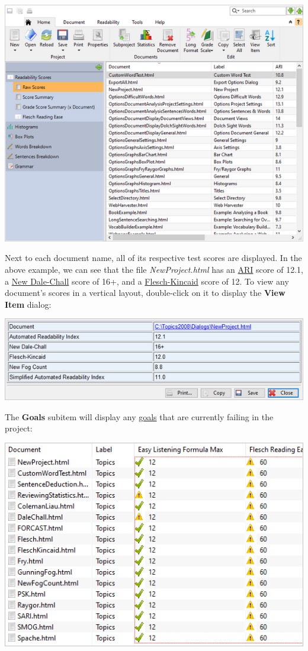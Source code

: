 \documentclass[
]{book}
\theoremstyle{definition}
\theoremstyle{definition}
\theoremstyle{definition}
\theoremstyle{definition}
\theoremstyle{remark}
\begin{document}
\includegraphics{Images/batchrawscores.png}

Next to each document name, all of its respective test scores are displayed. In the above example, we can see that the file \emph{NewProject.html} has an \protect\hyperlink{ari-test}{ARI} score of 12.1, a \protect\hyperlink{dale-chall-test}{New Dale-Chall} score of 16+, and a \protect\hyperlink{flesch-kincaid-test}{Flesch-Kincaid} score of 12. To view any document's scores in a vertical layout, double-click on it to display the \textbf{View Item} dialog:

\includegraphics{Images/viewitemrawscores.png}

The \textbf{Goals} subitem will display any \protect\hyperlink{reviewing-goals}{goals} that are currently failing in the project:

\begin{center}\includegraphics[width=0.75\linewidth,]{Images/BatchProjectGoals} \end{center}
\end{document}
